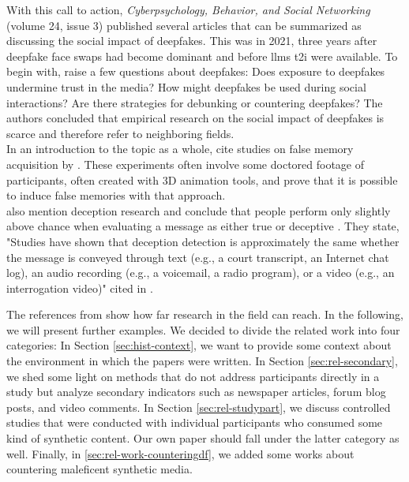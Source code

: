 \documentclass[
  a4paper,  %
  twoside,  %
  bibliography=totoc,
  headsepline,
  cleardoublepage=empty,
  parskip=half,
  draft=false
]{scrbook}
\begin{document}
With this call to action, \textit{Cyberpsychology, Behavior, and Social Networking} (volume 24, issue 3) published several articles that can be summarized as discussing the social impact of deepfakes. This was in 2021, three years after deepfake face swaps had become dominant and before \gls{llm}s \gls{t2i} were available. To begin with, \citet{hancockSocialImpactDeepfakes2021} raise a few questions about deepfakes: Does exposure to deepfakes undermine trust in the media? How might deepfakes be used during social interactions? Are there strategies for debunking or countering deepfakes? The authors concluded that empirical research on the social impact of deepfakes is scarce and therefore refer to neighboring fields. \\
In an introduction to the topic as a whole, \citet{hancockSocialImpactDeepfakes2021} cite studies on false memory acquisition by \citet{garryActuallyPictureWorth2005}. These experiments often involve some doctored footage of participants, often created with 3D animation tools, and prove that it is possible to induce false memories with that approach. \\
\citet{hancockSocialImpactDeepfakes2021} also mention deception research and conclude that people perform only slightly above chance when evaluating a message as either true or deceptive \cite{bondAccuracyDeceptionJudgments2006}. They state, "Studies have shown that deception detection is approximately the same whether the message is conveyed through text (e.g., a court transcript, an Internet chat log), an audio recording (e.g., a voicemail, a radio program), or a video (e.g., an interrogation video)" \cite{hancockSeeNoEvil2010} cited in \cite{hancockSocialImpactDeepfakes2021}.

The references from \citet{hancockSocialImpactDeepfakes2021} show how far research in the field can reach. In the following, we will present further examples. We decided to divide the related work into four categories: In Section \ref{sec:hist-context}, we want to provide some context about the environment in which the papers were written. In Section \ref{sec:rel-secondary}, we shed some light on methods that do not address participants directly in a study but analyze secondary indicators such as newspaper articles, forum blog posts, and video comments. In Section \ref{sec:rel-studypart}, we discuss controlled studies that were conducted with individual participants who consumed some kind of synthetic content. Our own paper should fall under the latter category as well. Finally, in \ref{sec:rel-work-counteringdf}, we added some works about countering maleficent synthetic media.
\end{document}
